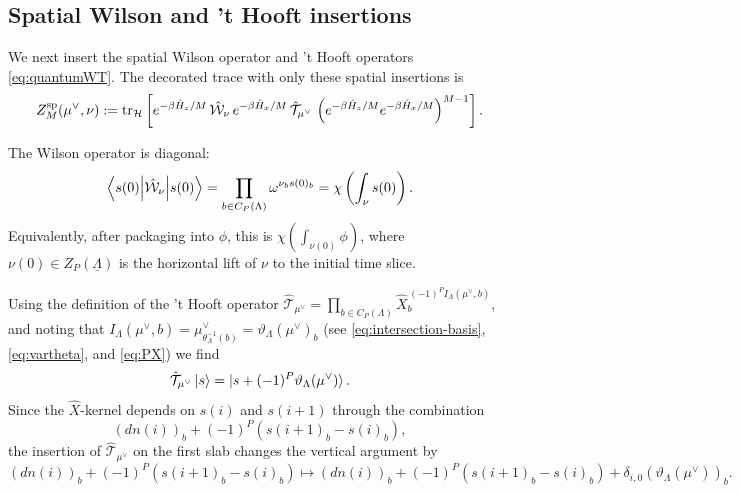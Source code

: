 \subsection{Spatial Wilson and 't Hooft insertions}
\label{app:TrSp}

We next insert the spatial Wilson operator and 't Hooft operators \eqref{eq:quantumWT}.  The
decorated trace with only these spatial insertions is
\begin{equation}
	Z_M^{\mathrm{sp}}(\mu^\vee,\nu)
	:=
	\mathrm{tr}_{\mathcal H}
	\left[
	e^{-\beta\hat H_z/M}\,
	\hat{\mathcal W}_\nu\,
	e^{-\beta\hat H_x/M}\,
	\hat{\mathcal T}_{\mu^\vee}\,
	\left(e^{-\beta\hat H_z/M}e^{-\beta\hat H_x/M}\right)^{M-1}
	\right].
	\label{eq:spatially-decorated}
\end{equation}

The Wilson operator is diagonal:
\begin{equation}
	\left\langle s(0) \middle| \hat{\mathcal W}_\nu \middle| s(0) \right\rangle
	=
	\prod_{b\in C_P(\Lambda)}\omega^{\nu_b s(0)_b}
	=
	\chi\left(\int_\nu s(0)\right).
	\label{eq:spatial-W-factor}
\end{equation}
Equivalently, after packaging into \(\phi\), this is $\chi\left(\int_{\nu(0)}\phi\right)$,
where \(\nu(0)\in Z_P(\underline\Lambda)\) is the horizontal lift of \(\nu\) to the initial
time slice.

Using the definition of the 't Hooft operator $\hat{\mathcal T}_{\mu^\vee}
=
\prod_{b\in C_P(\Lambda)}
\hat X_b^{\,(-1)^PI_\Lambda(\mu^\vee,b)}$, and noting that $I_\Lambda(\mu^\vee, b) = \mu^\vee_{\theta_{\Lambda}^{-1}(b)} = \vartheta_{\Lambda}(\mu^\vee)_b$ (see \eqref{eq:intersection-basis}, \eqref{eq:vartheta}, and \eqref{eq:PX}) we find
\begin{equation}
	\hat{\mathcal T}_{\mu^\vee}\ket{s}
	=
	\ket{s+(-1)^P\vartheta_\Lambda(\mu^\vee)}.
	\label{eq:T-shift}
\end{equation}
Since the \(\hat X\)-kernel depends on \(s(i)\) and \(s(i+1)\) through the combination
\begin{equation}
	(dn(i))_b+(-1)^P\left(s(i+1)_b-s(i)_b\right),
\end{equation}
the insertion of \(\hat{\mathcal T}_{\mu^\vee}\) on the first slab changes the vertical
argument by
\begin{equation}
	(dn(i))_b+(-1)^P\left(s(i+1)_b-s(i)_b\right)
	\mapsto
	(dn(i))_b+(-1)^P\left(s(i+1)_b-s(i)_b\right)
	+\delta_{i,0}(\vartheta_\Lambda(\mu^\vee))_b.
	\label{eq:T-vertical-shift}
\end{equation}

